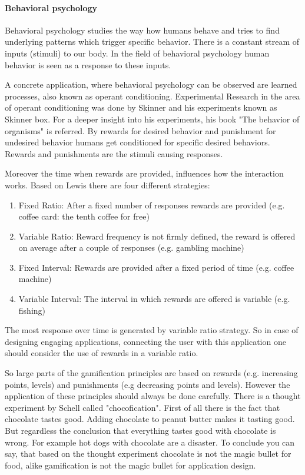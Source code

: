 \paragraph*{Behavioral psychology}

Behavioral psychology studies the way how humans behave and tries to find underlying patterns which trigger specific behavior. There is a constant stream of inputs (stimuli) to our body. In the field of  behavioral psychology human behavior is seen as a response to these inputs. \cite[p. 10]{lewisIrresistibleAppsMotivational2014}

A concrete application, where behavioral psychology can be observed are learned processes, also known as operant conditioning. Experimental Research in the area of operant conditioning was done by Skinner and his experiments known as Skinner box. For a deeper insight into his experiments, his book "The behavior of organisms" \cite{skinnerBehaviorOrganisms1938} is referred. By rewards for desired behavior and punishment for undesired behavior humans get conditioned for specific desired behaviors. Rewards and punishments are the stimuli causing responses. \cite[p. 11]{lewisIrresistibleAppsMotivational2014}

Moreover the time when rewards are provided, influences how the interaction works.
Based on Lewis \cite[p. 10]{lewisIrresistibleAppsMotivational2014} there are four different strategies:
\begin{enumerate}
	\item Fixed Ratio: After a fixed number of responses rewards are provided (e.g. coffee card: the tenth coffee for free)
	\item Variable Ratio: Reward frequency is not firmly defined, the reward is offered on average after a couple of responses (e.g. gambling machine)
	\item Fixed Interval: Rewards are provided after a fixed period of time (e.g. coffee machine)
	\item Variable Interval: The interval in which rewards are offered is variable (e.g. fishing)
\end{enumerate}

The most response over time is generated by variable ratio strategy. So in case of designing engaging applications, connecting the user with this application one should consider the use of rewards in a variable ratio. \cite[p. 11]{lewisIrresistibleAppsMotivational2014}

So large parts of the gamification principles are based on rewards (e.g. increasing points, levels) and punishments (e.g decreasing points and levels). However the application of these principles should always be done carefully. There is a thought experiment by Schell called "chocofication". First of all there is the fact that chocolate tastes good. Adding chocolate to peanut butter makes it tasting good. But regardless the conclusion that everything tastes good with chocolate is wrong. For example hot dogs with chocolate are a disaster. 
To conclude you can say, that based on the thought experiment chocolate is not the magic bullet for food, alike gamification is not the magic bullet for application design. \cite[p. 12]{lewisIrresistibleAppsMotivational2014}



